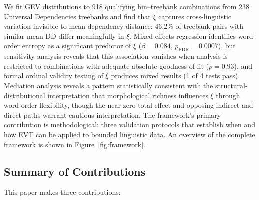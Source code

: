\documentclass[11pt,letterpaper]{article}
\begin{document}
We fit GEV distributions to 918 qualifying bin--treebank combinations from 238 Universal Dependencies treebanks and find that $\xi$ captures cross-linguistic variation invisible to mean dependency distance: 46.2\% of treebank pairs with similar mean DD differ meaningfully in $\xi$. Mixed-effects regression identifies word-order entropy as a significant predictor of $\xi$ ($\beta = 0.084$, $p_{\text{FDR}} = 0.0007$), but sensitivity analysis reveals that this association vanishes when analysis is restricted to combinations with adequate absolute goodness-of-fit ($p = 0.93$), and formal ordinal validity testing of $\xi$ produces mixed results (1 of 4 tests pass). Mediation analysis reveals a pattern statistically consistent with the structural-distributional interpretation that morphological richness influences $\xi$ through word-order flexibility, though the near-zero total effect and opposing indirect and direct paths warrant cautious interpretation. The framework's primary contribution is methodological: three validation protocols that establish when and how EVT can be applied to bounded linguistic data. An overview of the complete framework is shown in Figure~\ref{fig:framework}.

\subsection{Summary of Contributions}

This paper makes three contributions:
\end{document}
